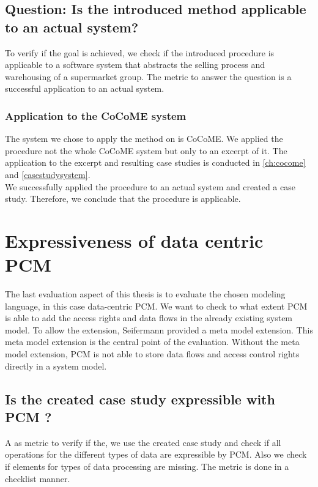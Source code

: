 \subsection{Question: Is the introduced method applicable to an actual system?}
To verify if the goal is achieved, we check if the introduced procedure is applicable to a software system that abstracts the selling process and warehousing of a supermarket group. The metric to answer the question is a successful application to an actual system.  
\subsubsection{Application to the CoCoME system}
The system we chose to apply the method on is CoCoME. We applied the procedure not the whole CoCoME system but only to an excerpt of it. The application to the excerpt and resulting case studies is conducted in \autoref{ch:cocome} and \autoref{casestudysystem}.\\ We successfully applied the procedure to an actual system and created a case study. Therefore, we conclude that the procedure is applicable.


\section{Expressiveness of data centric PCM}
The last evaluation aspect of this thesis is to evaluate the chosen modeling language, in this case data-centric PCM. We want to check to what extent PCM is able to add the access rights and data flows in the already existing system model. To allow the extension, Seifermann \cite{MMextension} provided a meta model extension. This meta model extension is the central point of the evaluation. Without the meta model extension, PCM is not able to store data flows and access control rights directly in a system model. 
\subsection{Is the created case study expressible with PCM ?}
A as metric to verify if the, we use the created case study and check if all operations for the different types of data are expressible by PCM. Also we check if elements for types of data processing are missing. The metric is done in a checklist manner. 
